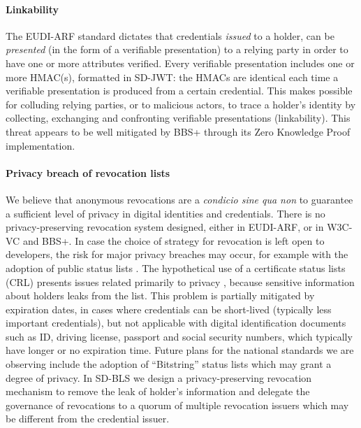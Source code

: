 \paragraph{Linkability}

The EUDI-ARF standard dictates that credentials \textit{issued} to a
holder, can be \textit{presented} (in the form of a verifiable
presentation) to a relying party in order to have one or more
attributes verified. Every verifiable presentation includes one or
more HMAC(s), formatted in SD-JWT: the HMACs are identical each time a
verifiable presentation is produced from a certain credential. This
makes possible for colluding relying parties, or to malicious actors,
to trace a holder's identity by collecting, exchanging and confronting
verifiable presentations (linkability). This threat appears to be well
mitigated by BBS+ through its Zero Knowledge Proof implementation.

\paragraph{Privacy breach of revocation lists}

We believe that anonymous revocations are a \textit{condicio sine qua
  non} to guarantee a sufficient level of privacy in digital
identities and credentials. There is no privacy-preserving revocation
system designed, either in EUDI-ARF, or in W3C-VC and BBS+. In case
the choice of strategy for revocation is left open to developers, the
risk for major privacy breaches may occur, for example with the
adoption of public status lists \cite{crlcomparison}. The hypothetical
use of a certificate status lists (CRL) presents issues related
primarily to privacy \cite{CRL}, because sensitive information about
holders leaks from the list. This problem is partially mitigated by
expiration dates, in cases where credentials can be short-lived
(typically less important credentials), but not applicable with
digital identification documents such as ID, driving license, passport
and social security numbers, which typically have longer or no
expiration time. Future plans for the national standards we are
observing include the adoption of ``Bitstring'' status lists
\cite{status-lists} which may grant a degree of privacy. In SD-BLS we
design a privacy-preserving revocation mechanism to remove the leak of
holder's information and delegate the governance of revocations to a
quorum of multiple revocation issuers which may be different from the
credential issuer.



